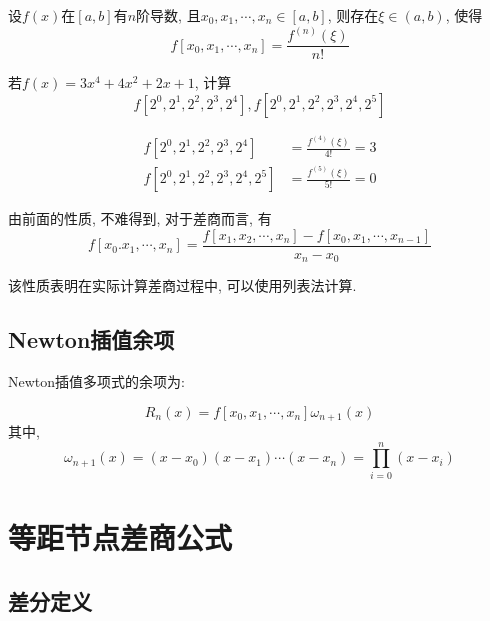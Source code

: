 设$f(x)$在$[a,b]$有$n$阶导数, 且$x_0,x_1,\cdots,x_n\in[a,b]$, 则存在$\xi\in(a,b)$, 使得
\begin{equation*}
    f[x_0,x_1,\cdots,x_n]=\frac{f^{(n)}(\xi)}{n!}
\end{equation*}

\begin{example}
    若$f(x)=3x^4+4x^2+2x+1$, 计算
    \begin{equation*}
        f[2^0,2^1,2^2,2^3,2^4], f[2^0,2^1,2^2,2^3,2^4,2^5]
    \end{equation*}
\end{example}

\begin{solution}
    \begin{align*}
        f[2^0,2^1,2^2,2^3,2^4]&=\frac{f^{(4)}(\xi)}{4!}=3\\
        f[2^0,2^1,2^2,2^3,2^4,2^5]&=\frac{f^{(5)}(\xi)}{5!}=0
    \end{align*}
\end{solution}

由前面的性质, 不难得到, 对于差商而言, 有
\begin{equation*}
    f[x_0.x_1,\cdots,x_n]=\frac{f[x_1,x_2,\cdots,x_n]-f[x_0,x_1,\cdots,x_{n-1}]}{x_n-x_0}
\end{equation*}

该性质表明在实际计算差商过程中, 可以使用列表法计算.

\subsection{Newton插值余项}

\begin{theorem}%
    Newton插值多项式的余项为:

    \begin{equation*}
        R_n(x)=f[x_0,x_1,\cdots,x_n]\omega_{n+1}(x)
    \end{equation*}
    其中,
    \begin{equation*}
        \omega_{n+1}(x)=(x-x_0)(x-x_1)\cdots(x-x_n)=\prod_{i=0}^n(x-x_i)
    \end{equation*}
\end{theorem}

\section{等距节点差商公式}

\subsection{差分定义}

